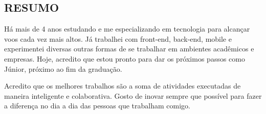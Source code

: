 
\begin{framed}
  \section{RESUMO}

  Há mais de 4 anos estudando e me especializando em tecnologia para alcançar voos cada vez mais altos. Já trabalhei com front-end, back-end, mobile e experimentei diversas outras formas de se trabalhar em ambientes acadêmicos e empresas. Hoje, acredito que estou pronto para dar os próximos passos como Júnior, próximo ao fim da graduação.

  Acredito que os melhores trabalhos são a soma de atividades executadas de maneira inteligente e colaborativa. Gosto de inovar sempre que possível para fazer a diferença no dia a dia das pessoas que trabalham comigo.

\end{framed}